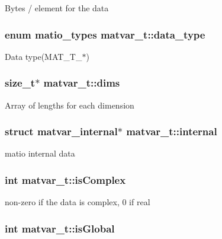 Bytes / element for the data \hypertarget{structmatvar__t_ab6aafe9bd77f0f077852593dec438144}{
\subsubsection[{data\_\-type}]{\setlength{\rightskip}{0pt plus 5cm}enum {\bf matio\_\-types} {\bf matvar\_\-t::data\_\-type}}}
\label{structmatvar__t_ab6aafe9bd77f0f077852593dec438144}
Data type(MAT\_\-T\_\-$\ast$) \hypertarget{structmatvar__t_a86a0006fff01d51e04d598d8fd48e619}{
\subsubsection[{dims}]{\setlength{\rightskip}{0pt plus 5cm}size\_\-t$\ast$ {\bf matvar\_\-t::dims}}}
\label{structmatvar__t_a86a0006fff01d51e04d598d8fd48e619}
Array of lengths for each dimension \hypertarget{structmatvar__t_aa69173e24ef1ac2853548d763f97006c}{
\subsubsection[{internal}]{\setlength{\rightskip}{0pt plus 5cm}struct {\bf matvar\_\-internal}$\ast$ {\bf matvar\_\-t::internal}}}
\label{structmatvar__t_aa69173e24ef1ac2853548d763f97006c}
matio internal data \hypertarget{structmatvar__t_aeb03b3a69f108dc05470b00443a43739}{
\subsubsection[{isComplex}]{\setlength{\rightskip}{0pt plus 5cm}int {\bf matvar\_\-t::isComplex}}}
\label{structmatvar__t_aeb03b3a69f108dc05470b00443a43739}
non-\/zero if the data is complex, 0 if real \hypertarget{structmatvar__t_af26c71c4c0ddb14931d15910dddac1bc}{
\subsubsection[{isGlobal}]{\setlength{\rightskip}{0pt plus 5cm}int {\bf matvar\_\-t::isGlobal}}}
